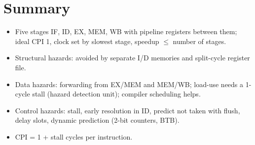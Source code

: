\section*{Summary}
\begin{itemize}
  \item Five stages IF, ID, EX, MEM, WB with pipeline registers between them;
    ideal CPI 1, clock set by slowest stage, speedup $\le$ number of stages.
  \item Structural hazards: avoided by separate I/D memories and split-cycle
    register file.
  \item Data hazards: forwarding from EX/MEM and MEM/WB; load-use needs a
    1-cycle stall (hazard detection unit); compiler scheduling helps.
  \item Control hazards: stall, early resolution in ID, predict not taken
    with flush, delay slots, dynamic prediction (2-bit counters, BTB).
  \item CPI = 1 + stall cycles per instruction.
\end{itemize}
